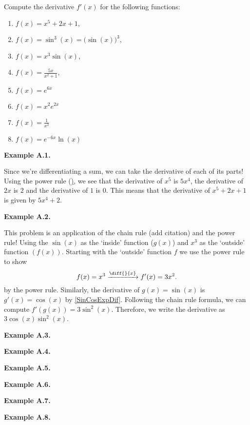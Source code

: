 \begin{exmps}

Compute the derivative $f'(x)$ for the following functions:
\begin{enumerate}[label=\textbf{Example A.\arabic*.}]
  \addtolength{\itemindent}{2.5cm} %
  \item \label{DifEA1} $f(x) = x^5+2x+1$,
  \item \label{DifEA2} $f(x) = \sin^3(x)=\big(\sin(x)\big)^3$,
  \item \label{DifEA3} $f(x) = x^3\sin(x)$,
  \item \label{DifEA4} $f(x) =\frac{5x}{x^2+1}$,
  \item \label{DifEA5} $f(x) = e^{6x}$
  \item \label{DifEA6} $f(x) = x^2e^{2x}$
  \item \label{DifEA7} $f(x) = \frac{1}{x^2}$
  \item \label{DifEA8} $f(x) = e^{-6x}\ln(x)$
\end{enumerate}

\textbf{Example A.1.}

Since we're differentiating a sum, we can take the derivative of each of its parts! Using the power rule (\href{PowRule}), we see that the derivative of $x^5$ is $5x^4$, the derivative of $2x$ is $2$ and the derivative of $1$ is 0. This means that the derivative of $x^5 + 2x + 1$ is given by $5x^4 + 2$.

\textbf{Example A.2.}

This problem is an application of the chain rule (add citation) and the power rule! Using the $\sin(x)$ as the `inside' function ($g(x)$) and $x^3$ as the `outside' function $(f(x))$. Starting with the `outside' function $f$ we use the power rule to show
\[
f(x) = x^3 \xrightarrow{\diff{}{x}} f'(x) = 3x^2.
\] by the power rule. Similarly, the derivative of $g(x) = \sin(x)$ is $g'(x) = \cos(x)$ by \cref{SinCosExpDif}. Following the chain rule formula, we can compute $f'(g(x)) = 3 \sin^2(x)$. Therefore, we write the derivative as $3\cos(x)\sin^2(x)$.

\textbf{Example A.3.}

\textbf{Example A.4.}

\textbf{Example A.5.}

\textbf{Example A.6.}

\textbf{Example A.7.}

\textbf{Example A.8.}

\end{exmps}

